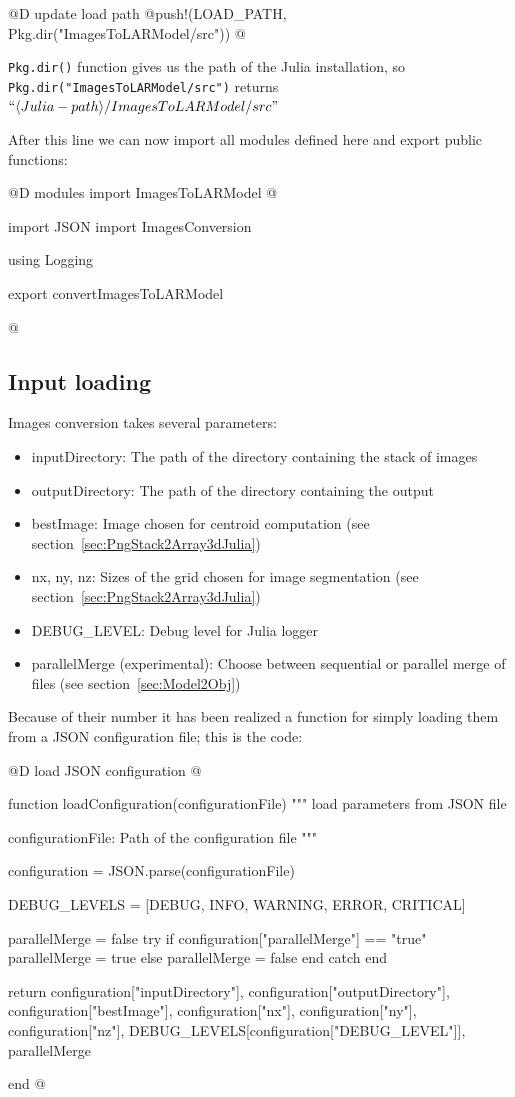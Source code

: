 \documentclass[11pt,oneside]{article}	%
\begin{document}
@D update load path
@{push!(LOAD_PATH, Pkg.dir("ImagesToLARModel/src"))
@}

\texttt{Pkg.dir()} function gives us the path of the Julia installation, so \texttt{Pkg.dir("ImagesToLARModel/src")} returns $``\langle Julia-path\rangle /ImagesToLARModel/src"$

After this line we can now import all modules defined here and export public functions:

@D modules import ImagesToLARModel
@{import JSON
import ImagesConversion

using Logging

export convertImagesToLARModel

@}

\subsection{Input loading}\label{sec:input}

Images conversion takes several parameters:

\begin{itemize}
 \item inputDirectory: The path of the directory containing the stack of images
 \item outputDirectory: The path of the directory containing the output
 \item bestImage: Image chosen for centroid computation (see section~\ref{sec:PngStack2Array3dJulia})
 \item nx, ny, nz: Sizes of the grid chosen for image segmentation (see section~\ref{sec:PngStack2Array3dJulia})
 \item DEBUG\_LEVEL: Debug level for Julia logger
 \item parallelMerge (experimental): Choose between sequential or parallel merge of files (see section~\ref{sec:Model2Obj})
\end{itemize}

Because of their number it has been realized a function for simply loading them from a JSON configuration file; this is the code:

@D load JSON configuration
@{function loadConfiguration(configurationFile)
  """
  load parameters from JSON file

  configurationFile: Path of the configuration file
  """

  configuration = JSON.parse(configurationFile)

  DEBUG_LEVELS = [DEBUG, INFO, WARNING, ERROR, CRITICAL]

  parallelMerge = false
  try
    if configuration["parallelMerge"] == "true"
      parallelMerge = true
    else
      parallelMerge = false
    end
  catch
  end

  return configuration["inputDirectory"], configuration["outputDirectory"],
	configuration["bestImage"],
        configuration["nx"], configuration["ny"], configuration["nz"],
        DEBUG_LEVELS[configuration["DEBUG_LEVEL"]],
        parallelMerge

end
@}
\end{document}
